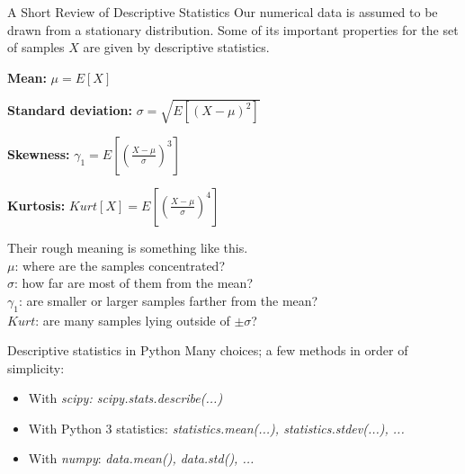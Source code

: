 \documentclass[bigger]{beamer}
\begin{document}
\begin{frame}{A Short Review of Descriptive Statistics}
Our numerical data is assumed to be drawn from a stationary
distribution. Some of its important properties for the set of
samples $X$ are given by descriptive statistics.
\begin{description}
\item{\bf Mean:} \(\mu = E[X]\) 
\item{\bf Standard deviation:} \(\sigma = \sqrt{E[ (X-\mu)^2 ]} \) 
\item{\bf Skewness:}  \(\gamma_1 = E[ (\frac{X-\mu}{\sigma})^3 ] \)
\item{\bf Kurtosis:}  \(Kurt[X] = E[ (\frac{X-\mu}{\sigma})^4 ] \)
\end{description}
Their rough meaning is something like this.\\
$\mu$: where are the samples concentrated?\\
$\sigma$: how far are most of them from the mean?\\
$\gamma_1$: are smaller or larger samples farther from the mean?\\
$Kurt$: are many samples lying outside of $\pm\sigma$?
\end{frame}


{
\begin{frame}{Descriptive statistics in Python}
Many choices; a few methods in order of simplicity:
\begin{itemize}
\item With {\em scipy: scipy.stats.describe(...)}
\item With Python 3 statistics: {\em statistics.mean(...), statistics.stdev(...), ...}
\item With {\em numpy}: {\em data.mean(), data.std(), ...}
\end{itemize}

\end{frame}
}
\end{document}
